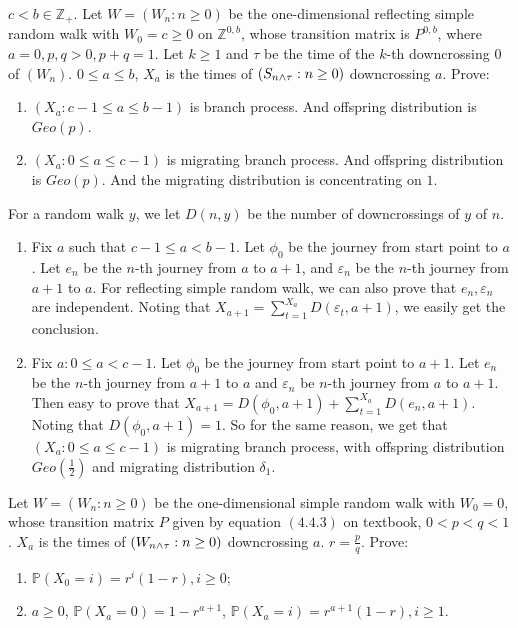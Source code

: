 \documentclass[../main]{subfiles}
\begin{document}
\begin{problem}\label{pro:2}
  \(c < b \in \mathbb{Z}_+\). Let \(W=(W_n :n \geq 0)\) be the one-dimensional reflecting simple
  random walk with \(W_0=c \geq 0\) on \(\mathbb{Z}^{0,b}\), whose transition matrix is \(P^{0,b}\), where
  \(a = 0,p,q >0, p + q =1\).
  Let \(k \geq 1\) and \(\tau\) be the time of the \(k\)-th downcrossing \(0\) of \((W_n)\).
  \(0 \leq a \leq b\),
  \(X_a\) is the times of \((S_{n \wedge \tau}:n \geq 0)\) downcrossing \(a\). Prove:
  \begin{enumerate}
    \item \((X_a:c-1 \leq a \leq b-1)\) is branch process.
      And offspring distribution is \(Geo(p)\).
    \item \((X_a:0 \leq a \leq c-1)\) is migrating branch process.
      And offspring distribution is \(Geo(p)\).
      And the migrating distribution is concentrating on \(1\).
  \end{enumerate}
\end{problem}
\begin{solution}
  For a random walk \(y\), we let \(D(n,y)\) be the number of downcrossings of \(y\) of \(n\).
  \begin{enumerate}
    \item Fix \(a\) such that \(c-1 \leq a < b-1\).
      Let \(\phi_0\) be the journey from start point to \(a\).
      Let \(e_n\) be the \(n\)-th journey from \(a\) to \(a+1\), and \(\varepsilon_n\) be the \(n\)-th journey from \(a+1\) to \(a\).
      For reflecting simple random walk, we can also prove that \(e_n,\varepsilon_n\) are independent.
      Noting that \(X_{a+1}=\sum_{t=1}^{X_a} D(\varepsilon_t,a+1)\), we easily get the conclusion.
    \item Fix \(a:0 \leq a<c-1\). Let \(\phi_0\) be the journey from start point to \(a+1\).
      Let \(e_n\) be the \(n\)-th journey from \(a+1\) to \(a\) and \(\varepsilon_n\) be \(n\)-th journey from \(a\) to \(a+1\).
      Then easy to prove that \(X_{a+1}=D(\phi_0,a+1)+\sum_{t=1}^{X_a} D(e_n,a+1)\).
      Noting that \(D(\phi_0,a+1)=1\). So for the same reason, we get that \((X_a:0 \leq a \leq c-1)\) is migrating branch process,
      with offspring distribution \(Geo(\frac{1}{2})\) and migrating distribution \(\delta_1\).
  \end{enumerate}
\end{solution}
\begin{problem}\label{pro:3}
  Let \(W=(W_n:n \geq 0)\) be the one-dimensional simple random walk with \(W_0=0\),
  whose transition matrix \(P\) given by equation \((4.4.3)\)
  on textbook, \(0< p<q<1\).
  \(X_a\) is the times of \((W_{n \wedge \tau}:n \geq 0)\) downcrossing \(a\).
  \(r=\frac{p}{q}\).
  Prove:
  \begin{enumerate}
    \item \label{ite:3.1} \(\mathbb{P}(X_0=i)=r^i(1-r),i \geq 0\);
    \item \(a \geq 0\), \(\mathbb{P}(X_a=0)=1-r^{a +1}\), \(\mathbb{P}(X_a=i)=r^{a + 1}(1 -r),i \geq 1\).
  \end{enumerate}
\end{problem}
\end{document}
